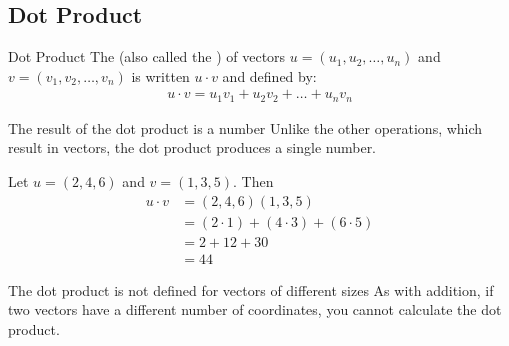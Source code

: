 \documentclass[\main/notes.tex]{subfiles}
\begin{document}
			\subsection{Dot Product}
				\begin{definition}[width=0.87\textwidth]{Dot Product}
					The  (also called the ) of vectors $u = (u_{1}, u_{2}, \ldots, u_{n})$ and \\$v = (v_{1}, v_{2}, \ldots, v_{n})$ is written $u \cdot v$ and defined by:
					\begin{align*}
						u \cdot v = u_{1}v_{1} + u_{2}v_{2} + \ldots + u_{n}v_{n}
					\end{align*}
				\end{definition}
				\begin{sidenote}{The result of the dot product is a number}
					Unlike the other operations, which result in vectors, the dot product produces a single number.
				\end{sidenote}
				\begin{example}[width=0.6\textwidth]
					Let $u = (2, 4, 6)$ and $v = (1, 3, 5)$. Then
					\begin{align*}
						u \cdot v &= (2, 4, 6)(1, 3, 5)\\
						&= (2 \cdot 1) + (4 \cdot 3) + (6 \cdot 5)\\
						&= 2 + 12 + 30\\
						&= 44
					\end{align*}
				\end{example}
				\begin{sidenote}{The dot product is not defined for vectors of different sizes}
					As with addition, if two vectors have a different number of coordinates, you cannot calculate the dot product.
				\end{sidenote}
\end{document}
